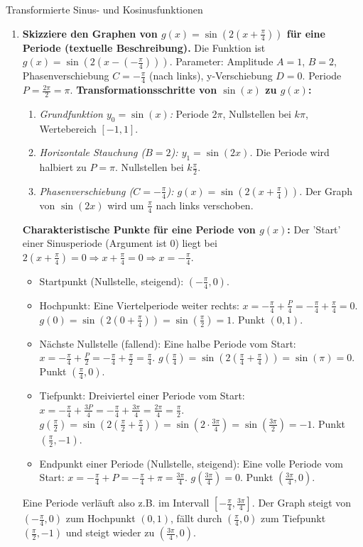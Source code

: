 \begin{loesungsumgebung}{Transformierte Sinus- und Kosinusfunktionen}
\begin{enumerate}[label=(\alph*)]
    \item \textbf{Skizziere den Graphen von $g(x) = \sin(2(x+\frac{\pi}{4}))$ für eine Periode (textuelle Beschreibung).}
    Die Funktion ist $g(x) = \sin(2(x - (-\frac{\pi}{4})))$.
    Parameter: Amplitude $A=1$, $B=2$, Phasenverschiebung $C=-\frac{\pi}{4}$ (nach links), y-Verschiebung $D=0$.
    Periode $P = \frac{2\pi}{2} = \pi$.
    \textbf{Transformationsschritte von $\sin(x)$ zu $g(x)$:}
    \begin{enumerate}
        \item \textit{Grundfunktion $y_0 = \sin(x)$:} Periode $2\pi$, Nullstellen bei $k\pi$, Wertebereich $[-1,1]$.
        \item \textit{Horizontale Stauchung ($B=2$): $y_1 = \sin(2x)$.} Die Periode wird halbiert zu $P=\pi$. Nullstellen bei $k\frac{\pi}{2}$.
        \item \textit{Phasenverschiebung ($C=-\frac{\pi}{4}$): $g(x) = \sin(2(x+\frac{\pi}{4}))$.} Der Graph von $\sin(2x)$ wird um $\frac{\pi}{4}$ nach links verschoben.
    \end{enumerate}
    \textbf{Charakteristische Punkte für eine Periode von $g(x)$:}
    Der 'Start' einer Sinusperiode (Argument ist $0$) liegt bei $2(x+\frac{\pi}{4})=0 \Rightarrow x+\frac{\pi}{4}=0 \Rightarrow x=-\frac{\pi}{4}$.
    \begin{itemize}
        \item Startpunkt (Nullstelle, steigend): $(-\frac{\pi}{4}, 0)$.
        \item Hochpunkt: Eine Viertelperiode weiter rechts: $x = -\frac{\pi}{4} + \frac{P}{4} = -\frac{\pi}{4} + \frac{\pi}{4} = 0$. $g(0) = \sin(2(0+\frac{\pi}{4})) = \sin(\frac{\pi}{2}) = 1$. Punkt $(0,1)$.
        \item Nächste Nullstelle (fallend): Eine halbe Periode vom Start: $x = -\frac{\pi}{4} + \frac{P}{2} = -\frac{\pi}{4} + \frac{\pi}{2} = \frac{\pi}{4}$. $g(\frac{\pi}{4}) = \sin(2(\frac{\pi}{4}+\frac{\pi}{4})) = \sin(\pi) = 0$. Punkt $(\frac{\pi}{4},0)$.
        \item Tiefpunkt: Dreiviertel einer Periode vom Start: $x = -\frac{\pi}{4} + \frac{3P}{4} = -\frac{\pi}{4} + \frac{3\pi}{4} = \frac{2\pi}{4} = \frac{\pi}{2}$. $g(\frac{\pi}{2}) = \sin(2(\frac{\pi}{2}+\frac{\pi}{4})) = \sin(2 \cdot \frac{3\pi}{4}) = \sin(\frac{3\pi}{2}) = -1$. Punkt $(\frac{\pi}{2},-1)$.
        \item Endpunkt einer Periode (Nullstelle, steigend): Eine volle Periode vom Start: $x = -\frac{\pi}{4} + P = -\frac{\pi}{4} + \pi = \frac{3\pi}{4}$. $g(\frac{3\pi}{4})=0$. Punkt $(\frac{3\pi}{4},0)$.
    \end{itemize}
    Eine Periode verläuft also z.B. im Intervall $[-\frac{\pi}{4}, \frac{3\pi}{4}]$. Der Graph steigt von $(-\frac{\pi}{4},0)$ zum Hochpunkt $(0,1)$, fällt durch $(\frac{\pi}{4},0)$ zum Tiefpunkt $(\frac{\pi}{2},-1)$ und steigt wieder zu $(\frac{3\pi}{4},0)$.


\end{enumerate}
\end{loesungsumgebung}
